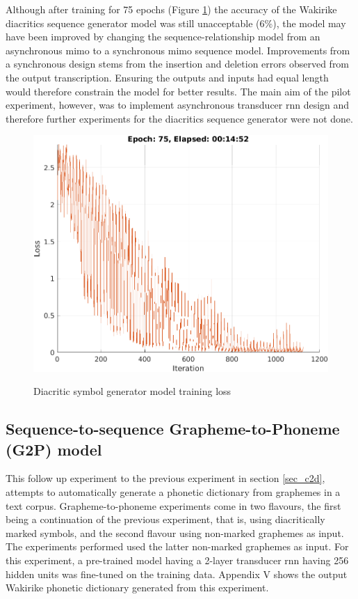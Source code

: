 Although after training for 75 epochs (Figure \ref{fig_c3_t2d00}) the accuracy of the Wakirike diacritics sequence generator model was still unacceptable (6\%), the model may have been improved by changing the sequence-relationship model from an asynchronous \acrshort{mimo} to a synchronous \acrshort{mimo} sequence model.  Improvements from a synchronous design stems from the insertion and deletion errors observed from the output transcription.  Ensuring the outputs and inputs had equal length would therefore constrain the model for better results.  The main aim of the pilot experiment, however, was to implement asynchronous transducer \acrshort{rnn} design and therefore further experiments for the diacritics sequence generator were not done.

\begin{figure}
\centering
  \includegraphics[width=14cm]{thesis/images/dtrain.png}\\
  \caption{Diacritic symbol generator model training loss}\label{fig_c3_t2d00}
\end{figure}

\subsection{Sequence-to-sequence Grapheme-to-Phoneme (G2P) model}\label{sec_c3_g2p}
This follow up experiment to the previous experiment in section \ref{sec_c2d},  attempts to automatically generate a phonetic dictionary from graphemes in a text corpus. Grapheme-to-phoneme experiments come in two flavours, the first being a continuation of the previous experiment, that is, using diacritically marked symbols, and the second flavour using non-marked graphemes as input.  The experiments performed used the latter non-marked graphemes as input.  For this experiment, a pre-trained model having a 2-layer transducer \acrshort{rnn} having 256 hidden units was fine-tuned on the training data.  Appendix V shows the output Wakirike phonetic dictionary generated from this experiment.

